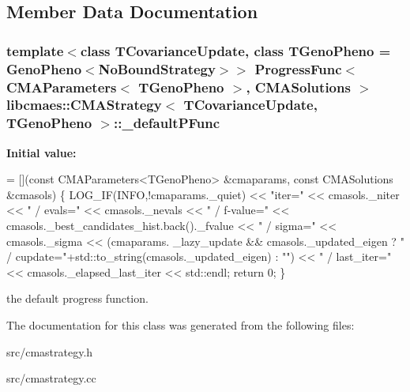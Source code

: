 \subsection{Member Data Documentation}
\hypertarget{classlibcmaes_1_1CMAStrategy_af6d980c670eef47ee810645739999d5b}{
\subsubsection[{\-\_\-default\-P\-Func}]{\setlength{\rightskip}{0pt plus 5cm}template$<$class T\-Covariance\-Update, class T\-Geno\-Pheno = Geno\-Pheno$<$\-No\-Bound\-Strategy$>$$>$ Progress\-Func$<$ {\bf C\-M\-A\-Parameters}$<$ T\-Geno\-Pheno $>$, {\bf C\-M\-A\-Solutions} $>$ {\bf libcmaes\-::\-C\-M\-A\-Strategy}$<$ T\-Covariance\-Update, T\-Geno\-Pheno $>$\-::\-\_\-default\-P\-Func\hspace{0.3cm}{\ttfamily [static]}}}\label{classlibcmaes_1_1CMAStrategy_af6d980c670eef47ee810645739999d5b}
{\bfseries Initial value\-:}
\begin{DoxyCode}
= [](\textcolor{keyword}{const} CMAParameters<TGenoPheno> &cmaparams, \textcolor{keyword}{const} CMASolutions &cmasols)
  \{
    LOG\_IF(INFO,!cmaparams.\_quiet) << \textcolor{stringliteral}{"iter="} << cmasols.\_niter << \textcolor{stringliteral}{" / evals="} << cmasols.\_nevals << \textcolor{stringliteral}{" /
       f-value="} << cmasols.\_best\_candidates\_hist.back().\_fvalue <<  \textcolor{stringliteral}{" / sigma="} << cmasols.\_sigma << (cmaparams.
      \_lazy\_update && cmasols.\_updated\_eigen ? \textcolor{stringliteral}{" / cupdate="}+std::to\_string(cmasols.\_updated\_eigen) : \textcolor{stringliteral}{""}) << \textcolor{stringliteral}{" /
       last\_iter="} << cmasols.\_elapsed\_last\_iter << std::endl;
    \textcolor{keywordflow}{return} 0;
  \}
\end{DoxyCode}
the default progress function. 

The documentation for this class was generated from the following files\-:\begin{DoxyCompactItemize}
\item 
src/cmastrategy.\-h\item 
src/cmastrategy.\-cc\end{DoxyCompactItemize}
